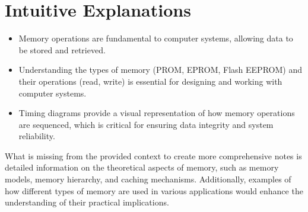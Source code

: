 \documentclass{article}
\begin{document}
\section{Intuitive Explanations}
\begin{itemize}
    \item Memory operations are fundamental to computer systems, allowing data to be stored and retrieved.
    \item Understanding the types of memory (PROM, EPROM, Flash EEPROM) and their operations (read, write) is essential for designing and working with computer systems.
    \item Timing diagrams provide a visual representation of how memory operations are sequenced, which is critical for ensuring data integrity and system reliability.
\end{itemize}
What is missing from the provided context to create more comprehensive notes is detailed information on the theoretical aspects of memory, such as memory models, memory hierarchy, and caching mechanisms. Additionally, examples of how different types of memory are used in various applications would enhance the understanding of their practical implications.
\end{document}
